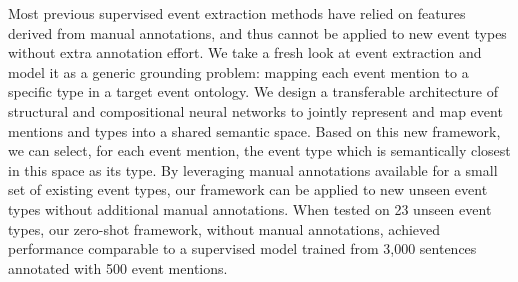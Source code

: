 Most previous supervised event extraction methods have relied on features derived from manual annotations, and thus cannot be applied to new event types without extra annotation effort. We take a fresh look at event extraction and model it as a generic grounding problem: mapping each event mention to a specific type in a target event ontology. We design a transferable architecture of structural and compositional neural networks to jointly represent and map event mentions and types into a shared semantic space. Based on this new framework, we can select, for each event mention, the event type which is semantically closest in this space as its type. By leveraging manual annotations available for a small set of existing event types, our framework can be applied to new unseen event types without additional manual annotations. When tested on 23 unseen event types, our zero-shot framework, without manual annotations, achieved  performance comparable to a supervised model trained from 3,000 sentences annotated with 500 event mentions.
